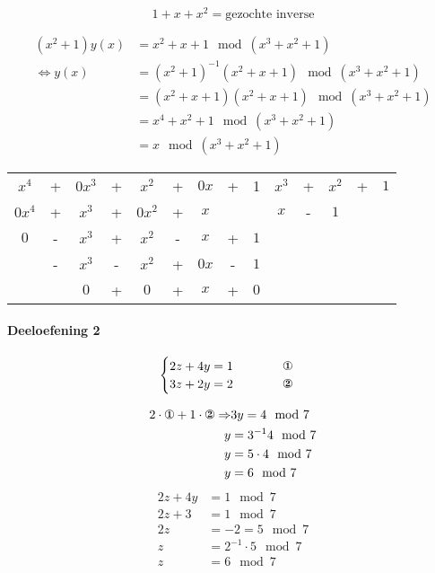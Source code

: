 \documentclass[12pt]{article}
\begin{document}
	\begin{equation}
		1+x+x^{2} = \text{gezochte inverse} 
	\end{equation}

	\begin{align}
	(x^{2}+1)y(x) &= x^{2}+x+1 \mod(x^{3}+x^{2}+1) \\
	\Leftrightarrow y(x) &= (x^{2}+1)^{-1} (x^{2}+x+1) \mod(x^{3}+x^{2}+1) \\
	&= (x^{2}+x+1)(x^{2}+x+1) \mod(x^{3}+x^{2}+1) \\
	&= x^{4}+x^{2}+1 \mod(x^{3}+x^{2}+1) \\
	&= x \mod(x^{3}+x^{2}+1)
	\end{align}

	\begin{table}[H]
	\centering
	\begin{tabular}{ccccccccc|ccccc}
		$x^{4}$&+&$0x^{3}$&+&$x^{2}$&+&$0x$&+&1&$x^{3}$&+&$x^{2}$&+&$1$ \\
		\cline{10-14}
		$0x^{4}$&+&$x^{3}$&+&$0x^{2}$&+&$x$& & &$x$&-&$1$& & \\
		\cline{1-9}
		$0$&-&$x^{3}$&+&$x^{2}$&-&$x$&+&$1$   &&&&& \\
		 &-&$x^{3}$&-&$x^{2}$&+&$0x$&-&$1$   &&&&& \\
		\cline{2-9}
		 & &$0$&+&$0$&+&$x$&+&$0$   &&&&& \\
	\end{tabular}
	\end{table}

	\paragraph{Deeloefening 2}
	
	\begin{equation}
		\begin{cases}
			2z + 4y = 1 \qquad \qquad \text{\ding{172}} \\
			3z + 2y = 2 \qquad \qquad \text{\ding{173}}
		\end{cases}
	\end{equation}


	\begin{align}
		2 \cdot \text{\ding{172}} + 1 \cdot \text{\ding{173}} \Rightarrow & 3y = 4 \mod 7 \\
		y &= 3^{-1} 4 \mod 7 \\
		y &= 5 \cdot 4 \mod 7 \\
		y &= 6 \mod 7 \\
	\end{align}
	\begin{align}
		2z + 4y &= 1 \mod 7 \\
		2z + 3 &= 1 \mod 7 \\
		2z &= -2 = 5 \mod 7 \\
		z &= 2^{-1} \cdot 5 \mod 7 \\
		z &= 6 \mod 7
	\end{align}
\end{document}
